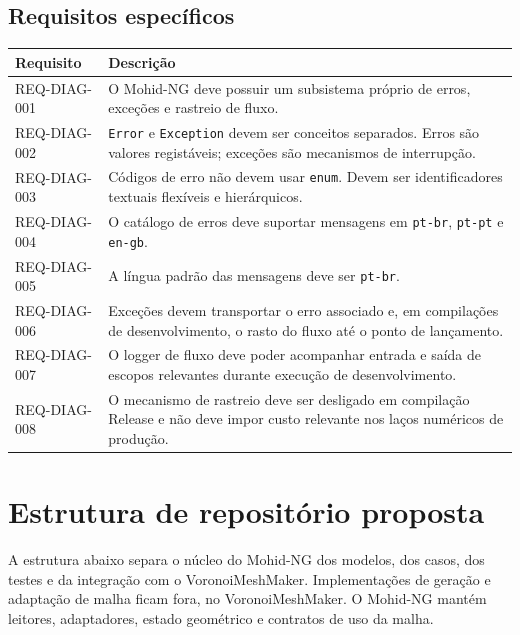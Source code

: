 \documentclass[11pt,a4paper]{article}
\begin{document}
\subsection{Requisitos espec\'ificos}

\begin{longtable}{p{}p{}}
\toprule
\textbf{Requisito} & \textbf{Descri\c{c}\~ao}\\
\midrule
REQ-DIAG-001 & O Mohid-NG deve possuir um subsistema pr\'oprio de erros, exce\c{c}\~oes e rastreio de fluxo.\\
\addlinespace
REQ-DIAG-002 & \texttt{Error} e \texttt{Exception} devem ser conceitos separados. Erros s\~ao valores regist\'aveis; exce\c{c}\~oes s\~ao mecanismos de interrup\c{c}\~ao.\\
\addlinespace
REQ-DIAG-003 & C\'odigos de erro n\~ao devem usar \texttt{enum}. Devem ser identificadores textuais flex\'iveis e hier\'arquicos.\\
\addlinespace
REQ-DIAG-004 & O cat\'alogo de erros deve suportar mensagens em \texttt{pt-br}, \texttt{pt-pt} e \texttt{en-gb}.\\
\addlinespace
REQ-DIAG-005 & A l\'ingua padr\~ao das mensagens deve ser \texttt{pt-br}.\\
\addlinespace
REQ-DIAG-006 & Exce\c{c}\~oes devem transportar o erro associado e, em compila\c{c}\~oes de desenvolvimento, o rasto do fluxo at\'e o ponto de lan\c{c}amento.\\
\addlinespace
REQ-DIAG-007 & O logger de fluxo deve poder acompanhar entrada e sa\'ida de escopos relevantes durante execu\c{c}\~ao de desenvolvimento.\\
\addlinespace
REQ-DIAG-008 & O mecanismo de rastreio deve ser desligado em compila\c{c}\~ao Release e n\~ao deve impor custo relevante nos la\c{c}os num\'ericos de produ\c{c}\~ao.\\
\bottomrule
\end{longtable}

\section{Estrutura de reposit\'orio proposta}

A estrutura abaixo separa o n\'ucleo do Mohid-NG dos modelos, dos casos, dos testes e da integra\c{c}\~ao com o VoronoiMeshMaker. Implementa\c{c}\~oes de gera\c{c}\~ao e adapta\c{c}\~ao de malha ficam fora, no VoronoiMeshMaker. O Mohid-NG mant\'em leitores, adaptadores, estado geom\'etrico e contratos de uso da malha.
\end{document}
